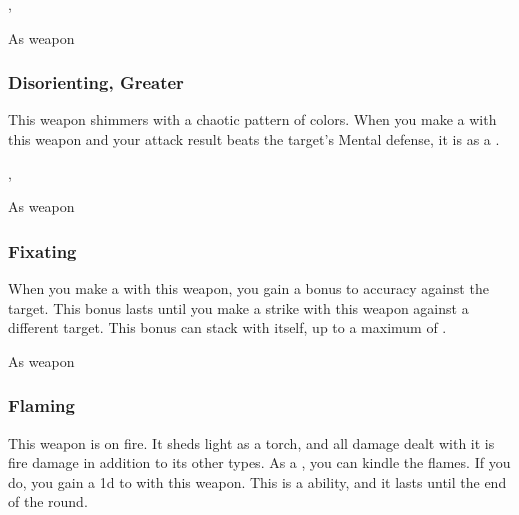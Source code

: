  , 


 As weapon


\lowercase{\hypertarget{item:Disorienting, Greater}{}}\label{item:Disorienting, Greater}
\hypertarget{item:Disorienting, Greater}{\subsubsection{Disorienting, Greater\hfill{}}}

This weapon shimmers with a chaotic pattern of colors.
When you make a  with this weapon and your attack result beats the target's Mental defense, it is \disoriented as a .



 , 


 As weapon


\lowercase{\hypertarget{item:Fixating}{}}\label{item:Fixating}
\hypertarget{item:Fixating}{\subsubsection{Fixating\hfill{}}}

When you make a  with this weapon, you gain a  bonus to accuracy against the target.
This bonus lasts until you make a strike with this weapon against a different target.
This bonus can stack with itself, up to a maximum of .



 As weapon


\lowercase{\hypertarget{item:Flaming}{}}\label{item:Flaming}
\hypertarget{item:Flaming}{\subsubsection{Flaming\hfill{}}}

This weapon is on fire.
It sheds light as a torch, and all damage dealt with it is fire damage in addition to its other types.
As a , you can kindle the flames.
If you do, you gain a \plus1d  to  with this weapon.
This is a  ability, and it lasts until the end of the round.



 


